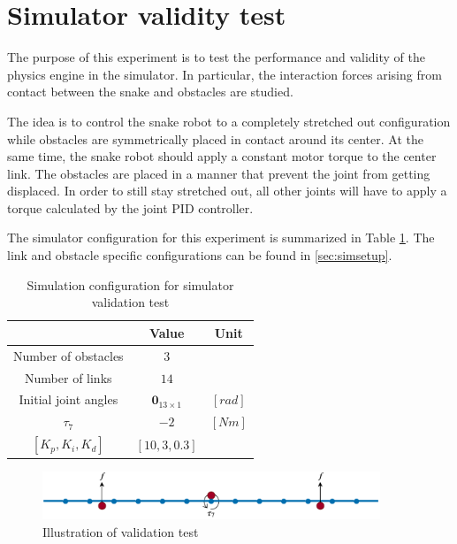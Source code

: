 \section{Simulator validity test}

The purpose of this experiment is to test the performance and validity of the physics engine in the simulator. In particular, the interaction forces arising from contact between the snake and obstacles are studied.

The idea is to control the snake robot to a completely stretched out configuration while obstacles are symmetrically placed in contact around its center. At the same time, the snake robot should apply a constant motor torque to the center link. The obstacles are placed in a manner that prevent the joint from getting displaced. In order to still stay stretched out, all other joints will have to apply a torque calculated by the joint PID controller.

The simulator configuration for this experiment is summarized in Table \ref{tab:exp_valid1}. The link and obstacle specific configurations can be found in \ref{sec:simsetup}.

\begin{table}[h!]
    \centering
    \begin{tabular}{|c|c|c|}
        \hline
        & \textbf{Value} & \textbf{Unit}\\
        \hline \hline
        Number of obstacles & $3$ & \\
        Number of links & $14$ & \\
        Initial joint angles & $\mathbf{0}_{13 \times 1}$ & $[rad]$ \\
        $\tau_7$ & $-2$ & $[Nm]$ \\
        $[K_p, K_i, K_d]$ & $[10, 3, 0.3]$ &\\
        \hline
    \end{tabular}
    \caption{Simulation configuration for simulator validation test}
    \label{tab:exp_valid1}
\end{table}

\begin{figure}
    \centering
    \includegraphics[width=0.9\textwidth]{figures/experiments/exp_valid1.pdf}
    \caption{Illustration of validation test}
    \label{fig:valid1_sketch}
\end{figure}

